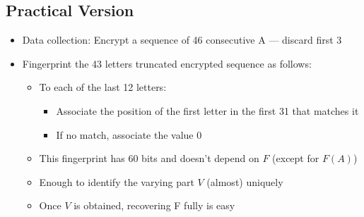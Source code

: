        	\subsection{Practical Version}
       		\begin{itemize}
       			\item Data collection: Encrypt a sequence of 46 consecutive A — discard first 3
       			\item Fingerprint the 43 letters truncated encrypted sequence as follows:
       				\begin{itemize}
       					\item To each of the last 12 letters:
       						\begin{itemize}
       							\item Associate the position of the first letter in the first 31 that matches it
       							\item If no match, associate the value 0
       						\end{itemize}
       					\item This fingerprint has 60 bits and doesn’t depend on $F$ (except for $F(A)$)
       					\item Enough to identify the varying part $V$ (almost) uniquely
       					\item Once $V$ is obtained, recovering F fully is easy
       				\end{itemize}
       		\end{itemize}

































